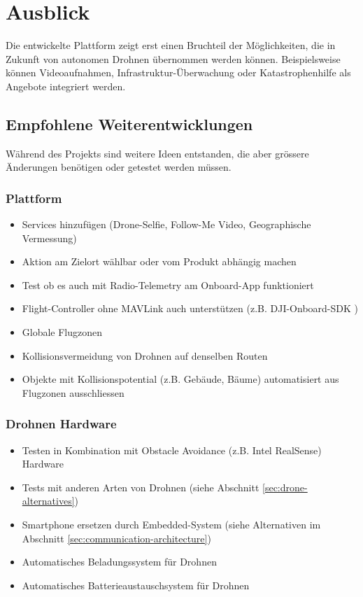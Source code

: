 \section{Ausblick}

Die entwickelte Plattform zeigt erst einen Bruchteil der Möglichkeiten, die in Zukunft von autonomen Drohnen übernommen werden können. Beispielsweise können Videoaufnahmen, Infrastruktur-Überwachung oder Katastrophenhilfe als Angebote integriert werden. 

\subsection{Empfohlene Weiterentwicklungen}

Während des Projekts sind weitere Ideen entstanden, die aber grössere Änderungen benötigen oder getestet werden müssen. 

\subsubsection{Plattform}

\begin{itemize}
	\item Services hinzufügen (Drone-Selfie, Follow-Me Video, Geographische Vermessung)
	\item Aktion am Zielort wählbar oder vom Produkt abhängig machen
	\item Test ob es auch mit Radio-Telemetry am Onboard-App funktioniert
	\item Flight-Controller ohne MAVLink auch unterstützen (z.B. DJI-Onboard-SDK \cite{dji-sdk})
	\item Globale Flugzonen
	\item Kollisionsvermeidung von Drohnen auf denselben Routen
	\item Objekte mit Kollisionspotential (z.B. Gebäude, Bäume) automatisiert aus Flugzonen ausschliessen
\end{itemize}

\subsubsection{Drohnen Hardware} 
\begin{itemize}
	\item Testen in Kombination mit Obstacle Avoidance (z.B. Intel RealSense\cite{realsense}) Hardware
		\item Tests mit anderen Arten von Drohnen (siehe Abschnitt \ref{sec:drone-alternatives})
	\item Smartphone ersetzen durch Embedded-System (siehe Alternativen im Abschnitt \ref{sec:communication-architecture}) 

	\item Automatisches Beladungssystem für Drohnen
	\item Automatisches Batterieaustauschsystem für Drohnen
\end{itemize}  



